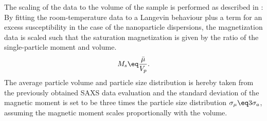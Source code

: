 \documentclass[\main/dresen_thesis.tex]{subfiles}
\begin{document}
    The scaling of the data to the volume of the sample is performed as described in :
    By fitting the room-temperature data to a Langevin behaviour plus a term for an excess susceptibility in the case of the nanoparticle dispersions, the magnetization data is scaled such that the saturation magnetization is given by the ratio of the single-particle moment and volume.
    \begin{align}
      M_s \eq \frac{\bar{\mu}}{V_p}.
    \end{align}
    The average particle volume and particle size distribution is hereby taken from the previously obtained SAXS data evaluation and the standard deviation of the magnetic moment is set to be three times the particle size distribution $\sigma_{\mu} \eq 3 \sigma_{a}$, assuming the magnetic moment scales proportionally with the volume.

\end{document}
